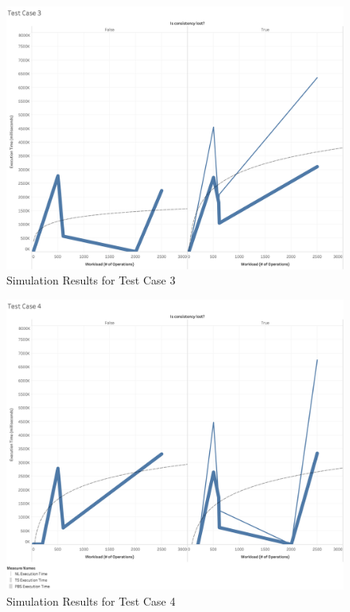 \begin{figure}
\centering
\includegraphics[scale=0.23]{images/TestCase3(WL).png}
\caption{Simulation Results for Test Case 3}
\label{results:test_case_graphs_3}
\end{figure}

\begin{figure}
\centering
\includegraphics[scale=0.23]{images/TestCase4(WL).png}
\caption{Simulation Results for Test Case 4}
\label{results:test_case_graphs_4}
\end{figure}

